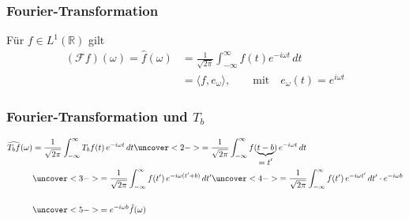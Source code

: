 %
%
%
\theoremstyle{definition}
\newtheorem{plancherel}{Plancherel-Formel}

\begin{frame}
\frametitle{Fourier-Transformation}
\begin{definition}
Für $f\in L^1(\mathbb R)$ gilt
\begin{align*}
(\mathcal{F}f)(\omega)
=
\hat{f}(\omega)
&=
\frac{1}{\sqrt{2\pi}} \int_{-\infty}^\infty f(t) e^{-i\omega t}\,dt
\\
&=
\langle f,e_\omega\rangle,\qquad\text{mit}\quad e_{\omega}(t) = e^{i\omega t}
\end{align*}
\end{definition}
\end{frame}

%
%
\begin{frame}
\frametitle{Fourier-Transformation und $T_b$}
\begin{align*}
\widehat{T_bf}(\omega)
&=
\frac{1}{\sqrt{2\pi}}
\int_{-\infty}^{\infty} T_bf(t)\,e^{-i\omega t}\,dt
\uncover<2->{
=
\frac{1}{\sqrt{2\pi}}
\int_{-\infty}^{\infty} f(\underbrace{t-b}_{\displaystyle=t'})\,e^{-i\omega t}\,dt
}
\\
&\uncover<3->{=
\frac{1}{\sqrt{2\pi}}
\int_{-\infty}^{\infty} f(t')\,e^{-i\omega (t'+b)}\,dt'}
\uncover<4->{=
\frac{1}{\sqrt{2\pi}}
\int_{-\infty}^{\infty} f(t')\,e^{-i\omega t'}\,dt'
\cdot
e^{-i\omega b}}
\\[14pt]
&\uncover<5->{=
e^{-i\omega b}\hat{f}(\omega)}
\end{align*}
\end{frame}

